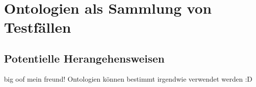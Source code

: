 \chapter{Ontologien als Sammlung von Testfällen}
\section{Potentielle Herangehensweisen}
big oof mein freund! Ontologien können bestimmt irgendwie verwendet werden :D